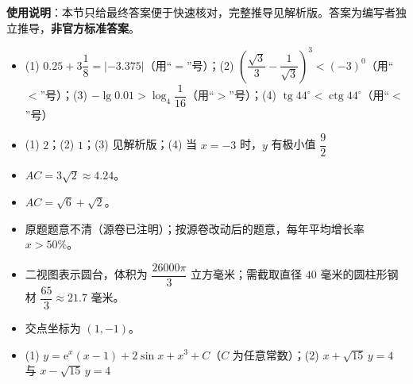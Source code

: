 
\begin{gknotice}
\textbf{使用说明}：本节只给最终答案便于快速核对，完整推导见解析版。答案为编写者独立推导，\textbf{非官方标准答案}。
\end{gknotice}

\begin{itemize}[leftmargin=2.6em]
  \item[\textbf{1.}] (1) $0.25+3\dfrac{1}{8}=|-3.375|$（用“$=$”号）；(2) $\left(\dfrac{\sqrt{3}}{3}-\dfrac{1}{\sqrt{3}}\right)^{3}<(-3)^{0}$（用“$<$”号）；(3) $-\lg 0.01>\log_4\dfrac{1}{16}$（用“$>$”号）；(4) $\operatorname{tg}44^\circ<\operatorname{ctg}44^\circ$（用“$<$”号）
  \item[\textbf{2.}] (1) $2$；(2) $1$；(3) 见解析版；(4) 当 $x=-3$ 时，$y$ 有极小值 $\dfrac{9}{2}$
  \item[\textbf{3.}] $AC=3\sqrt{2}\approx 4.24$。
  \item[\textbf{4.}] $AC=\sqrt{6}+\sqrt{2}$。
  \item[\textbf{5.}] 原题题意不清（源卷已注明）；按源卷改动后的题意，每年平均增长率 $x>50\%$。
  \item[\textbf{6.}] 二视图表示圆台，体积为 $\dfrac{26000\pi}{3}$ 立方毫米；需截取直径 $40$ 毫米的圆柱形钢材 $\dfrac{65}{3}\approx 21.7$ 毫米。
  \item[\textbf{7.}] 交点坐标为 $(1,-1)$。
  \item[\textbf{8.}] (1) $y=\mathrm{e}^{x}(x-1)+2\sin x+x^{3}+C$（$C$ 为任意常数）；(2) $x+\sqrt{15}\,y=4$ 与 $x-\sqrt{15}\,y=4$
\end{itemize}

